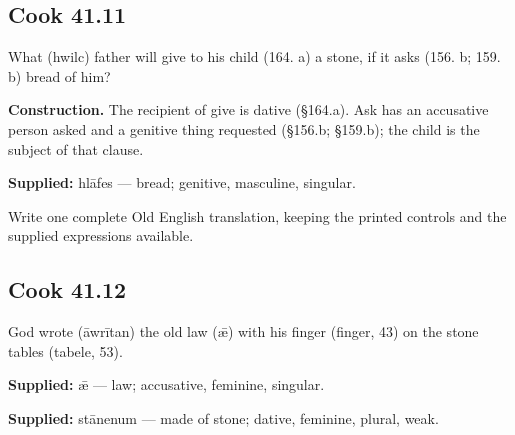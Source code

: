 \par\begin{minipage}{\linewidth}\raggedright
\subsection*{Cook 41.11}

What (hwilc) father will give to his child (164. a) a stone, if it asks (156. b; 159. b) bread of him?

\textbf{Construction.} The recipient of give is dative (§164.a). Ask has an accusative person asked and a genitive thing requested (§156.b; §159.b); the child is the subject of that clause.

\end{minipage}\par\addvspace{4pt}

\textbf{Supplied:} hlāfes — bread; genitive, masculine, singular.

Write one complete Old English translation, keeping the printed controls and the supplied expressions available.

\par\begin{minipage}{\linewidth}\raggedright
\subsection*{Cook 41.12}

God wrote (āwrītan) the old law (ǣ) with his finger (finger, 43) on the stone tables (tabele, 53).

\end{minipage}\par\addvspace{4pt}

\textbf{Supplied:} ǣ — law; accusative, feminine, singular.

\textbf{Supplied:} stānenum — made of stone; dative, feminine, plural, weak.

